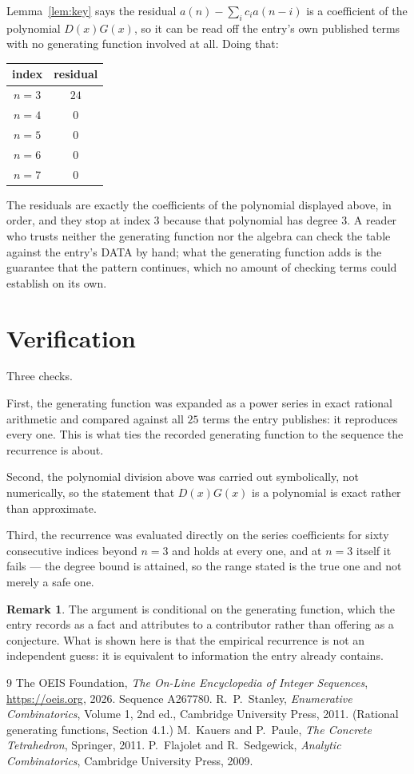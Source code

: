 \documentclass[11pt,a4paper]{article}
\theoremstyle{plain}
\theoremstyle{definition}
\newtheorem{remark}[theorem]{Remark}
\begin{document}
Lemma~\ref{lem:key} says the residual $a(n)-\sum_ic_ia(n-i)$ is a coefficient of the
polynomial $D(x)G(x)$, so it can be read off the entry's own published terms with no
generating function involved at all. Doing that:
\begin{center}
\begin{tabular}{cc}
index & residual \\ \hline
$n=3$ & $24$ \\
$n=4$ & $0$ \\
$n=5$ & $0$ \\
$n=6$ & $0$ \\
$n=7$ & $0$
\end{tabular}
\end{center}
The residuals are exactly the coefficients of the polynomial displayed above, in order, and
they stop at index $3$ because that polynomial has degree $3$. A reader who trusts
neither the generating function nor the algebra can check the table against the entry's DATA
by hand; what the generating function adds is the guarantee that the pattern continues, which
no amount of checking terms could establish on its own.

\section{Verification}

Three checks.

First, the generating function was expanded as a power series in exact rational arithmetic and
compared against all $25$ terms the entry publishes: it reproduces every one. This is
what ties the recorded generating function to the sequence the recurrence is about.

Second, the polynomial division above was carried out symbolically, not numerically, so the
statement that $D(x)G(x)$ is a polynomial is exact rather than approximate.

Third, the recurrence was evaluated directly on the series coefficients for sixty consecutive
indices beyond $n=3$ and holds at every one, and at $n=3$ itself it fails --- the
degree bound is attained, so the range stated is the true one and not merely a safe one.

\begin{remark}
The argument is conditional on the generating function, which the entry records as a fact and
attributes to a contributor rather than offering as a conjecture. What is shown here is that
the empirical recurrence is not an independent guess: it is equivalent to information the
entry already contains.
\end{remark}

\begin{thebibliography}{9}
 The OEIS Foundation, \emph{The On-Line Encyclopedia of Integer
Sequences}, \url{https://oeis.org}, 2026. Sequence A267780.
 R.~P.~Stanley, \emph{Enumerative Combinatorics}, Volume 1, 2nd ed.,
Cambridge University Press, 2011. (Rational generating functions, Section 4.1.)
 M.~Kauers and P.~Paule, \emph{The Concrete Tetrahedron}, Springer, 2011.
 P.~Flajolet and R.~Sedgewick, \emph{Analytic Combinatorics}, Cambridge
University Press, 2009.
\end{thebibliography}
\end{document}
